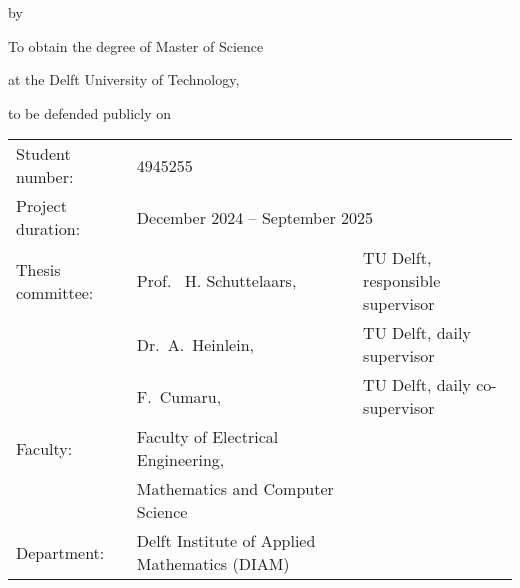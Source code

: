\begin{titlepage}

    \begin{center}

        {\makeatletter
            \largecoverstyle\fontsize{40}{40}\selectfont\@title
            \makeatother}

        {\makeatletter
            \ifdefvoid{\@subtitle}{}{\bigskip\coverstyle\fontsize{22}{22}\selectfont\@subtitle}
            \makeatother}

        \bigskip
        \bigskip

        by

        \bigskip
        \bigskip

        {\makeatletter
            \coverstyle\fontsize{14}{14}\selectfont\@author
            \makeatother}

        \bigskip
        \bigskip

        To obtain the degree of Master of Science

        at the Delft University of Technology,

        to be defended publicly on \theDefenseDateTime

        \vfill

        \begin{tabular}{lll}
            Student number:   & 4945255                                                                                \\
            Project duration: & \multicolumn{2}{l}{December 2024 -- September 2025}                                    \\
            Thesis committee: & Prof. \ H. Schuttelaars,                            & TU Delft, responsible supervisor \\
                              & Dr.\ A.\ Heinlein,                                  & TU Delft, daily supervisor       \\
                              & F.\ Cumaru,                                         & TU Delft, daily co-supervisor    \\
            Faculty:          & Faculty of Electrical Engineering,                                                     \\
                              & Mathematics and Computer Science                                                       \\
            Department:       & Delft Institute of Applied Mathematics (DIAM)                                          \\
        \end{tabular}


\end{center}
\end{titlepage}

